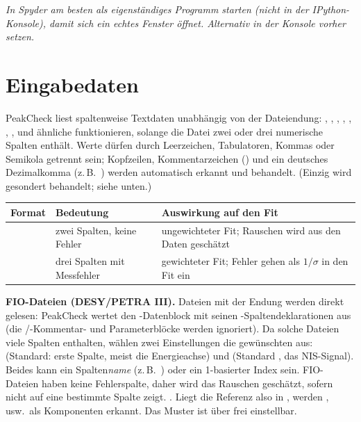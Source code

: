 \documentclass[11pt,a4paper]{article}
\begin{document}
\noindent\textit{In Spyder am besten als eigenst\"andiges Programm starten (nicht
in der IPython-Konsole), damit sich ein echtes Fenster \"offnet. Alternativ in der
Konsole vorher  setzen.}

\section{Eingabedaten}
PeakCheck liest spaltenweise Textdaten unabh\"angig von der Dateiendung:
, , , , , ,
,  und \"ahnliche funktionieren, solange die Datei zwei
oder drei numerische Spalten enth\"alt. Werte d\"urfen durch Leerzeichen,
Tabulatoren, Kommas oder Semikola getrennt sein; Kopfzeilen, Kommentarzeichen
(\code{# ! \%}) und ein deutsches Dezimalkomma (z.\,B.\ ) werden
automatisch erkannt und behandelt. (Einzig  wird gesondert behandelt;
siehe unten.)

\begin{table}[h]\small\centering
\begin{tabularx}{\linewidth}{@{}l l L@{}}
\toprule
\textbf{Format} & \textbf{Bedeutung} & \textbf{Auswirkung auf den Fit}\\
\midrule
{} & zwei Spalten, keine Fehler & ungewichteter Fit; Rauschen wird aus den Daten gesch\"atzt\\
 & drei Spalten mit Messfehler & gewichteter Fit; Fehler gehen als $1/\sigma$ in den Fit ein\\
\bottomrule
\end{tabularx}
\end{table}

\noindent\textbf{FIO-Dateien (DESY/PETRA III).} Dateien mit der Endung
 werden direkt gelesen: PeakCheck wertet den -Datenblock mit
seinen -Spaltendeklarationen aus (die /-Kommentar-
und Parameterbl\"ocke werden ignoriert). Da solche Dateien viele Spalten
enthalten, w\"ahlen zwei Einstellungen die gew\"unschten aus:
 (Standard: erste Spalte, meist die Energieachse) und
 (Standard , das NIS-Signal). Beides kann ein
Spalten\emph{name} (z.\,B.\ ) oder ein 1-basierter Index sein.
FIO-Dateien haben keine Fehlerspalte, daher wird das Rauschen gesch\"atzt, sofern
 nicht auf eine bestimmte Spalte zeigt.
. Liegt die Referenz also in , werden
,  usw.\ als Komponenten erkannt. Das Muster
ist \"uber  frei einstellbar.
\end{document}
